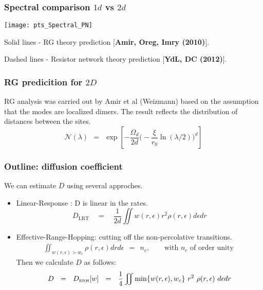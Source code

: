 \documentclass{beamer}
\newcommand{\tbox}[1]{\mbox{\tiny #1}}
\begin{document}
\begin{frame}
\frametitle{Spectral comparison $1d$ vs $2d$}

\texttt{[image: pts\_Spectral\_PN]}


Solid lines - RG theory prediction [{\bf Amir, Oreg, Imry (2010)}].

Dashed lines  - Resistor network theory prediction [{\bf YdL, DC (2012)}].
\end{frame}

\begin{frame}
\frametitle{RG predicition for $2D$}
RG analysis was carried out by Amir et al (Weizmann) based on the assumption that the modes are localized dimers.
The result reflects the distribution of distances between the sites.
\[ \mathcal{N}(\lambda) \ \ = \ \ \exp\left[ -\frac{\Omega_d}{2d} \Big(-\frac{\xi}{r_0} \ln(\lambda/2)\Big)^d \right]\]
\end{frame}

\begin{frame}
\frametitle{Outline: diffusion coefficient}
We can estimate $D$ using several approches.
\begin{itemize}
\item Linear-Response : D is linear in the rates.
  \[D_{\textrm{LRT}} \quad = \quad \frac{1}{2d}\iint w(r,\epsilon)r^2\rho(r,\epsilon)d\epsilon dr\]
\item Effective-Range-Hopping: cutting off the non-percolative transitions.
%
\begin{align*}
\iint_{w(r,\epsilon)>w_c} \rho(r,\epsilon)drd\epsilon \ \ = \ \ n_c, 
\ \ \ \ \ \ \ \ \ \mbox{with $n_c$ of order unity }
\end{align*}
%
Then we calculate $D$ as follows:
%
\[
D \ \ = \ \ D_{\tbox{ERH}}[{w}]  \ \ = \ \ \frac{1}{4}\iint \min\{w(r,\epsilon),w_c\} \ r^2  \ \rho(r,\epsilon) \ d\epsilon dr
\]
%
\end{itemize}

\end{frame}
\end{document}
